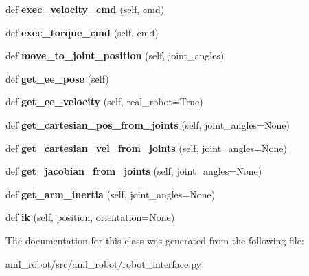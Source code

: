 \begin{DoxyCompactItemize}
def {\bfseries exec\+\_\+velocity\+\_\+cmd} (self, cmd)
\item 
\hypertarget{classaml__robot_1_1robot__interface_1_1_robot_interface_af135fa60a7158b6a73c02cc5344d091f}{}\label{classaml__robot_1_1robot__interface_1_1_robot_interface_af135fa60a7158b6a73c02cc5344d091f} 
def {\bfseries exec\+\_\+torque\+\_\+cmd} (self, cmd)
\item 
\hypertarget{classaml__robot_1_1robot__interface_1_1_robot_interface_ac4ec53b057a9d46a908d9668d37ae16a}{}\label{classaml__robot_1_1robot__interface_1_1_robot_interface_ac4ec53b057a9d46a908d9668d37ae16a} 
def {\bfseries move\+\_\+to\+\_\+joint\+\_\+position} (self, joint\+\_\+angles)
\item 
\hypertarget{classaml__robot_1_1robot__interface_1_1_robot_interface_ae639028b2bb82456c3da7f6112451995}{}\label{classaml__robot_1_1robot__interface_1_1_robot_interface_ae639028b2bb82456c3da7f6112451995} 
def {\bfseries get\+\_\+ee\+\_\+pose} (self)
\item 
\hypertarget{classaml__robot_1_1robot__interface_1_1_robot_interface_a1909c8dec66ce7ce1924ab56185b1caf}{}\label{classaml__robot_1_1robot__interface_1_1_robot_interface_a1909c8dec66ce7ce1924ab56185b1caf} 
def {\bfseries get\+\_\+ee\+\_\+velocity} (self, real\+\_\+robot=True)
\item 
\hypertarget{classaml__robot_1_1robot__interface_1_1_robot_interface_a79af2785b3ba1fc3d5711cfba2fc2eb8}{}\label{classaml__robot_1_1robot__interface_1_1_robot_interface_a79af2785b3ba1fc3d5711cfba2fc2eb8} 
def {\bfseries get\+\_\+cartesian\+\_\+pos\+\_\+from\+\_\+joints} (self, joint\+\_\+angles=None)
\item 
\hypertarget{classaml__robot_1_1robot__interface_1_1_robot_interface_aaf3a82ac887b9a526fff4e6ec9aff9a1}{}\label{classaml__robot_1_1robot__interface_1_1_robot_interface_aaf3a82ac887b9a526fff4e6ec9aff9a1} 
def {\bfseries get\+\_\+cartesian\+\_\+vel\+\_\+from\+\_\+joints} (self, joint\+\_\+angles=None)
\item 
\hypertarget{classaml__robot_1_1robot__interface_1_1_robot_interface_a1611bdce63f04b25875b8d93ad2b650b}{}\label{classaml__robot_1_1robot__interface_1_1_robot_interface_a1611bdce63f04b25875b8d93ad2b650b} 
def {\bfseries get\+\_\+jacobian\+\_\+from\+\_\+joints} (self, joint\+\_\+angles=None)
\item 
\hypertarget{classaml__robot_1_1robot__interface_1_1_robot_interface_a24bd167e2550141cf35c733d55aa0d87}{}\label{classaml__robot_1_1robot__interface_1_1_robot_interface_a24bd167e2550141cf35c733d55aa0d87} 
def {\bfseries get\+\_\+arm\+\_\+inertia} (self, joint\+\_\+angles=None)
\item 
\hypertarget{classaml__robot_1_1robot__interface_1_1_robot_interface_a25e70c5d3c7c9b8fc84f13c77d8ae5a1}{}\label{classaml__robot_1_1robot__interface_1_1_robot_interface_a25e70c5d3c7c9b8fc84f13c77d8ae5a1} 
def {\bfseries ik} (self, position, orientation=None)
\end{DoxyCompactItemize}


The documentation for this class was generated from the following file\+:\begin{DoxyCompactItemize}
\item 
aml\+\_\+robot/src/aml\+\_\+robot/robot\+\_\+interface.\+py\end{DoxyCompactItemize}
